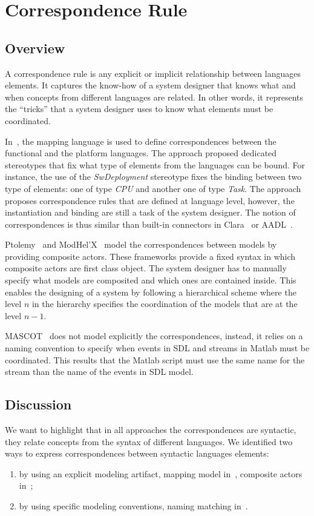 \section{Correspondence Rule}
	\subsection{Overview}
A correspondence rule is any explicit or implicit relationship between languages elements. It captures the know-how of a system designer that knows what and when concepts from different languages are related. In other words, it represents the ``tricks'' that a system designer uses to know what elements must be coordinated.%

In~\cite{dinatale}, the mapping language is used to define correspondences between the functional and the platform languages. The approach proposed dedicated stereotypes that fix what type of elements from the languages can be bound. For instance, the use of the \emph{SwDeployment} stereotype fixes the binding between two type of elements: one of type \emph{CPU} and another one of type \emph{Task}. The approach proposes correspondence rules that are defined at language level, however, the instantiation and binding are still a task of the system designer. The notion of correspondences is thus similar than built-in connectors in Clara~\cite{clarabib} or AADL~\cite{aadlbib}. 
		
Ptolemy~\cite{ptoleframebib} and ModHel'X~\cite{modhelxbib} model the correspondences between models by providing composite actors. These frameworks provide a fixed syntax in which composite actors are first class object. The system designer has to manually specify what models are composited and which ones are contained inside. This enables the designing of a system by following a hierarchical scheme where the level $n$ in the hierarchy specifies the coordination of the models that are at the level $n-1$.

MASCOT~\cite{mascotbib} does not model explicitly the correspondences, instead, it relies on a naming convention to specify when events in SDL and streams in Matlab must be coordinated. This results that the Matlab script must use the same name for the stream than the name of the events in SDL model.  

\subsection{Discussion}
We want to highlight that in all approaches the correspondences are syntactic, \ie they relate concepts from the syntax of different languages. We identified two ways to express correspondences between syntactic languages elements:
\begin{enumerate}
 \item by using an explicit modeling artifact, \eg mapping model in~\cite{dinatale}, composite actors in~\cite{modhelxbib, ptoleframebib}; 	
  \item by using specific modeling conventions, \eg naming matching in~\cite{mascotbib}.
\end{enumerate}
				
